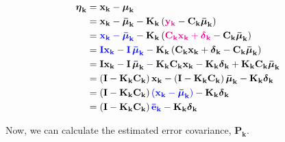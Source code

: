 \documentclass[12pt]{article}
\newcommand{\bvec}[1]{\boldsymbol{\mathbf{#1}}} %
\newcommand{\mat}[1]{\boldsymbol{\mathbf{#1}}}
\newcommand{\parentheses}[1]{\left(#1\right)}
\newcommand{\mb}[1]{{\boldsymbol{#1}}} %
\newcommand{\blue}[1]{\color{blue}#1\color{black}}
\newcommand{\magenta}[1]{\color{magenta}#1\color{black}}
\begin{document}
\begin{equation}
    \begin{aligned}
       \mb{\eta}_\mathbf{k} &= \bvec{x_k} - \mb{\mu}_\mathbf{k} \\
       &= \bvec{x_k} - \mb{\bar{\mu}}_\mathbf{k} - \mat{K_k}\parentheses{\magenta{\bvec{y_k}} - \mat{C_k}\mb{\bar{\mu}}_\mathbf{k}}\\
       &= \blue{\bvec{x_k} - \mb{\bar{\mu}}_\mathbf{k}} - \mat{K_k}\parentheses{\magenta{\mat{C_k}\bvec{x_k} + \mb{\delta}_\mathbf{k}} - \mat{C_k}\mb{\bar{\mu}}_\mathbf{k}}\\
       &= \blue{\mat{I}\bvec{x_k} - \mat{I}\,\mb{\bar{\mu}}_\mathbf{k}} - \mat{K_k}\parentheses{\mat{C_k}\bvec{x_k} + \mb{\delta}_\mathbf{k} - \mat{C_k}\mb{\bar{\mu}}_\mathbf{k}}\\
       &= \mat{I}\bvec{x_k} - \mat{I}\,\mb{\bar{\mu}}_\mathbf{k} - \mat{K_k}\mat{C_k}\bvec{x_k} - \mat{K_k}\mb{\delta}_\mathbf{k} + \mat{K_k}\mat{C_k}\mb{\bar{\mu}}_\mathbf{k}\\
       &= \parentheses{\mat{I} - \mat{K_k}\mat{C_k}}\bvec{x_k} - \parentheses{\mat{I} - \mat{K_k}\mat{C_k}}\mb{\bar{\mu}}_\mathbf{k} - \mat{K_k}\mb{\delta}_\mathbf{k}\\
       &= \parentheses{\mat{I} - \mat{K_k}\mat{C_k}} \blue{\parentheses{\bvec{x_k} - \mb{\bar{\mu}}_\mathbf{k}}} - \mat{K_k}\mb{\delta}_\mathbf{k}\\
       &= \parentheses{\mat{I} - \mat{K_k}\mat{C_k}} \blue{\bvec{\bar{e}_k}} - \mat{K_k}\mb{\delta}_\mathbf{k}\\
    \end{aligned}
    \label{eq:estimated-error}
\end{equation}

Now, we can calculate the estimated error covariance, $\mat{P_k}$.
\end{document}
